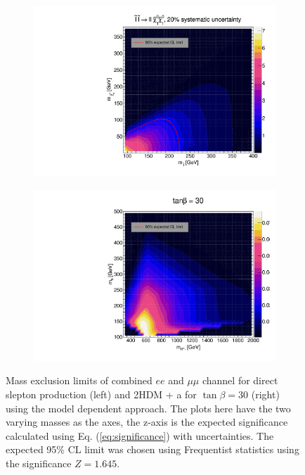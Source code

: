 \documentclass[12pt, a4paper]{book}
\begin{document}
\begin{figure}[!ht]
	\centering
	\begin{subfigure}[b]{0.49\textwidth}
      \centering
      \includegraphics[width=1\textwidth]{Limits/SlepSlep/SlepSlep_ll.pdf}
   \end{subfigure}
   \hfill
   \begin{subfigure}[b]{0.49\textwidth}
      \centering
      \includegraphics[width=1\textwidth]{Limits/2HDM/2HDM_ll_tb30.pdf}
   \end{subfigure}
   \caption[Mass exclusion limits of combined $ee$ and $\mu\mu$ channel for direct slepton production and 2HDM + a using the model dependent approach]{
      Mass exclusion limits of combined $ee$ and $\mu\mu$ channel for direct slepton production (left) and 2HDM + a for $\tan\beta=30$ (right) using the model dependent approach. The plots here have the two varying masses as the axes, the z-axis is the expected significance calculated using Eq. (\ref{eq:significance}) with uncertainties. The expected 95\% CL limit was chosen using Frequentist statistics using the significance $Z=1.645$.   
}
\end{figure}
\end{document}

